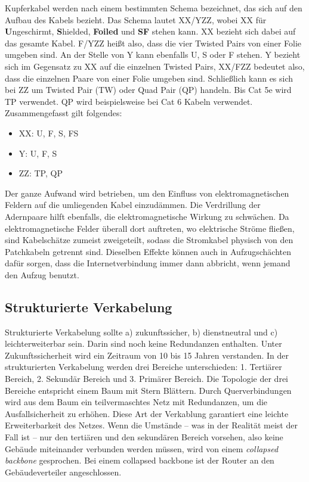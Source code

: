 Kupferkabel werden nach einem bestimmten Schema bezeichnet, das sich auf den Aufbau des Kabels bezieht. Das Schema lautet XX/YZZ, wobei XX für {\bf U}ngeschirmt, {\bf S}hielded, {\bf Foiled} und {\bf SF} stehen kann. XX bezieht sich dabei auf das gesamte Kabel. F/YZZ heißt also, dass die vier Twisted Pairs von einer Folie umgeben sind. An der Stelle von Y kann ebenfalls U, S oder F stehen. Y bezieht sich im Gegensatz zu XX auf die einzelnen Twisted Pairs, XX/FZZ bedeutet also, dass die einzelnen Paare von einer Folie umgeben sind. Schließlich kann es sich bei ZZ um Twisted Pair (TW) oder Quad Pair (QP) handeln. Bis Cat 5e wird TP verwendet. QP wird beispielsweise bei Cat 6 Kabeln verwendet. Zusammengefasst gilt folgendes: 
\begin{itemize}
	\itemsep0em
	\item XX: U, F, S, FS 
	\item  Y: U, F, S
	\item ZZ: TP, QP
\end{itemize}
Der ganze Aufwand wird betrieben, um den Einfluss von elektromagnetischen Feldern auf die umliegenden Kabel einzudämmen.	 Die Verdrillung der Adernpaare hilft ebenfalls, die elektromagnetische Wirkung zu schwächen. Da elektromagnetische Felder überall dort auftreten, wo elektrische Ströme fließen, sind Kabelschätze zumeist zweigeteilt, sodass die Stromkabel physisch von den Patchkabeln getrennt sind. Dieselben Effekte können auch in Aufzugschächten dafür sorgen, dass die Internetverbindung immer dann abbricht, wenn jemand den Aufzug benutzt.

\subsection{Strukturierte Verkabelung}

Strukturierte Verkabelung sollte a) zukunftssicher, b) dienstneutral und c) leichterweiterbar sein. Darin sind noch keine Redundanzen enthalten. Unter Zukunftssicherheit wird ein Zeitraum von 10 bis 15 Jahren verstanden. In der strukturierten Verkabelung werden drei Bereiche unterschieden: 1. Tertiärer Bereich, 2. Sekundär Bereich und 3. Primärer Bereich. Die Topologie der drei Bereiche entspricht einem Baum mit Stern \ql Blättern\qr. Durch Querverbindungen wird aus dem Baum ein teilvermaschtes Netz mit Redundanzen, um die Ausfallsicherheit zu erhöhen. Diese Art der Verkablung garantiert eine leichte Erweiterbarkeit des Netzes. Wenn die Umstände -- was in der Realität meist der Fall ist -- nur den tertiären und den sekundären Bereich vorsehen, also keine Gebäude miteinander verbunden werden müssen, wird von einem {\it collapsed backbone} gesprochen. Bei einem collapsed backbone ist der Router an den Gebäudeverteiler angeschlossen.


